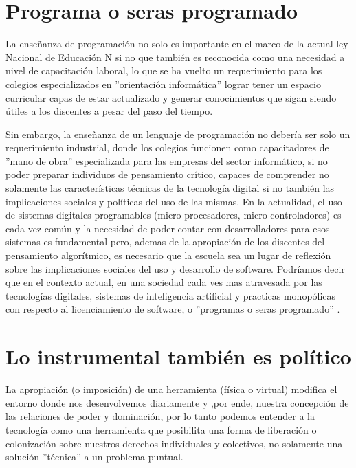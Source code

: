  
 
 \section{Programa o seras programado}
 
 La enseñanza de programación no solo es importante en el marco de la actual ley Nacional de Educación N si no que también es reconocida como una necesidad a nivel de capacitación laboral, lo que se ha vuelto un requerimiento para los colegios especializados en ''orientación informática'' lograr tener un espacio curricular capas de estar actualizado y generar conocimientos que sigan siendo útiles a los discentes a pesar del paso del tiempo.
 
 Sin embargo, la enseñanza de un lenguaje de programación no debería ser solo un requerimiento industrial, donde los colegios funcionen como capacitadores de ''mano de obra'' especializada para las empresas del sector informático, si no poder preparar individuos de pensamiento crítico, capaces de comprender no solamente las características técnicas de la tecnología digital si no también las implicaciones sociales y políticas del uso de las mismas. En la actualidad, el uso de sistemas digitales programables (micro-procesadores, micro-controladores) es cada vez común y la necesidad de poder contar con desarrolladores para esos sistemas es fundamental pero, ademas de la apropiación de los discentes del pensamiento algorítmico, es necesario que la escuela sea un lugar de reflexión sobre las implicaciones sociales del uso y desarrollo de software.
 Podríamos decir que en el contexto actual, en una sociedad cada ves mas atravesada por las tecnologías digitales, sistemas de inteligencia artificial y practicas monopólicas con respecto al licenciamiento de software, o ''programas o seras programado'' \citep{rushkoff2010program}.
 
 \section{Lo instrumental también es político}
 
 La apropiación (o imposición) de una herramienta (física o virtual) modifica el entorno donde nos desenvolvemos diariamente  y ,por ende, nuestra concepción de las relaciones de poder y dominación, por lo tanto podemos entender a la tecnología como una herramienta que posibilita una forma de liberación o colonización sobre nuestros derechos individuales y colectivos, no solamente una solución ''técnica'' a un problema puntual.
 
